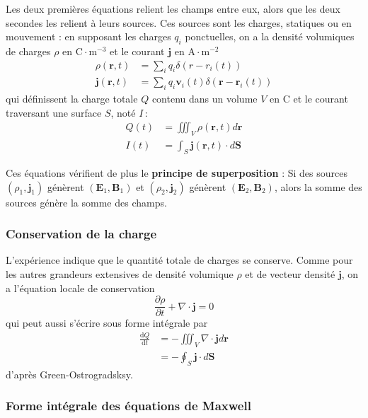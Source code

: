         Les deux premières équations relient les champs entre eux, alors que les deux secondes les relient à leurs sources. Ces sources sont les charges, statiques ou en mouvement : en supposant les charges $q_i$ ponctuelles, on a la densité volumiques de charges $\rho$ en $\text{C} \cdot \text{m}^{-3}$ et le courant $\mathbf{j}$ en $\text{A} \cdot \text{m}^{-2}$ 
        \begin{align*}
            \rho(\mathbf{r},t) &= \sum_{i} q_i \delta(r - r_i(t)) \\
            \mathbf{j}(\mathbf{r},t) &= \sum_{i} q_i \mathbf{v}_i(t) \delta(\mathbf{r} - \mathbf{r}_i(t))
        \end{align*}
        qui définissent la charge totale $Q$ contenu dans un volume $V$ en $\text{C}$ et le courant traversant une surface $S$, noté $I$ :
        \begin{align*}
            Q(t) &= \iiint_V \rho(\mathbf{r},t) d\mathbf{r} \\
            I(t) &= \int_S \mathbf{j}(\mathbf{r},t) \cdot d \mathbf{S}
        \end{align*}

        Ces équations vérifient de plus le \textbf{principe de superposition} : Si des sources $(\rho_1, \mathbf{j}_1)$ génèrent $(\mathbf{E}_1, \mathbf{B}_1)$ et $(\rho_2, \mathbf{j}_2)$ génèrent $(\mathbf{E}_2, \mathbf{B}_2)$, alors la somme des sources génère la somme des champs.

        \subsubsection{Conservation de la charge}

        L’expérience indique que le quantité totale de charges se conserve. Comme pour les autres grandeurs extensives de densité volumique $\rho$ et de vecteur densité $\mathbf{j}$, on a l’équation locale de conservation 
        \[ \frac{\partial \rho}{\partial t} + \nabla \cdot \mathbf{j} = 0 \]   
        qui peut aussi s’écrire sous forme intégrale par 
        \begin{align*}
            \frac{\text{d}Q}{\text{d}t} 
            &= - \iiint_V \nabla \cdot \mathbf{j} d\mathbf{r} \\
            &= - \oint_{S} \mathbf{j}\cdot d\mathbf{S} 
        \end{align*} 
        d’après Green-Ostrogradsksy.


        \subsubsection{Forme intégrale des équations de Maxwell}

